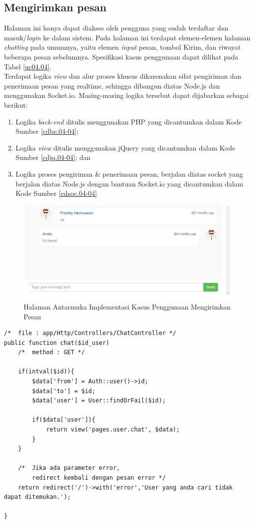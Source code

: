 \subsection{Mengirimkan pesan}
Halaman ini hanya dapat diakses oleh pengguna yang sudah terdaftar dan masuk/\textit{login} ke dalam sistem. Pada halaman ini terdapat elemen-elemen halaman \textit{chatting} pada umumnya, yaitu elemen \textit{input} pesan, tombol Kirim, dan riwayat beberapa pesan sebelumnya. Spesifikasi kasus penggunaan dapat dilihat pada Tabel \ref{uc04.04}.\\
\indent Terdapat logika \textit{view} dan alur proses khusus dikarenakan sifat pengiriman dan penerimaan pesan yang realtime, sehingga dibangun diatas Node.js dan menggunakan Socket.io. Masing-masing logika tersebut dapat dijabarkan sebagai berikut:
	\begin{enumerate}
		\item Logika \textit{back-end} ditulis menggunakan PHP yang dicantumkan dalam Kode Sumber \ref{cdbe.04-04}; 
		\item Logika \textit{view} ditulis menggunakan jQuery yang dicantumkan dalam Kode Sumber \ref{cdjq.04-04}; dan
		\item Logika proses pengiriman \& penerimaan pesan, berjalan diatas socket yang berjalan diatas Node.js dengan bantuan Socket.io yang dicantumkan dalam Kode Sumber \ref{cdsoc.04-04}
	\end{enumerate}

\begin{figure}[H]
\centering
\includegraphics[width=\textwidth]{images/bab4/ui/04-04.png}
\caption{Halaman Antarmuka Implementasi Kasus Penggunaan Mengirimkan Pesan}
\label{ui.04-04}
\end{figure}

\begin{lstlisting}[label=cdbe.04-04,style=php,caption=Kode Sumber \textit{Back-end} Mengirimkan Pesan]
/*	file : app/Http/Controllers/ChatController */
public function chat($id_user)
	/*	method : GET */

    if(intval($id)){
        $data['from'] = Auth::user()->id;
        $data['to'] = $id;
        $data['user'] = User::findOrFail($id);

        if($data['user']){
            return view('pages.user.chat', $data);
        }
    }

    /* 	Jika ada parameter error, 
    	redirect kembali dengan pesan error */
    return redirect('/')->with('error','User yang anda cari tidak dapat ditemukan.');

}
\end{lstlisting}

